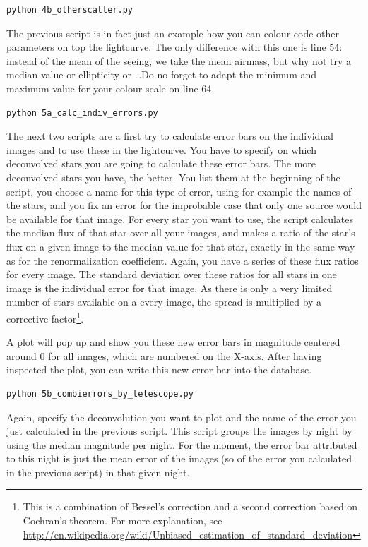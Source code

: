\begin{Verbatim}
python 4b_otherscatter.py
\end{Verbatim}

The previous script is in fact just an example how you can colour-code other parameters on top the lightcurve. The only difference with this one is line 54: instead of the mean of the seeing, we take the mean airmass, but why not try a median value or ellipticity or \ldots Do no forget to adapt the minimum and maximum value for your colour scale on line 64.

\begin{Verbatim}
python 5a_calc_indiv_errors.py
\end{Verbatim}

The next two scripts are a first try to calculate error bars on the individual images and to use these in the lightcurve. You have to specify on which deconvolved stars you are going to calculate these error bars. The more deconvolved stars you have, the better. You list them at the beginning of the script, you choose a name for this type of error, using for example the names of the stars, and you fix an error for the improbable case that only one source would be available for that image. 
For every star you want to use, the script calculates the median flux of that star over all your images, and makes a ratio of the star's flux on a given image to the median value for that star, exactly in the same way as for the renormalization coefficient. Again, you have a series of these flux ratios for every image. The standard deviation over these ratios for all stars in one image is the individual error for that image. As there is only a very limited number of stars available on a every image, the spread is multiplied by a corrective factor\footnote{This is a combination of Bessel's correction and a second correction based on Cochran's theorem. For more explanation, see \url{http://en.wikipedia.org/wiki/Unbiased_estimation_of_standard_deviation}}. 

A plot will pop up and show you these new error bars in magnitude centered around 0 for all images, which are numbered on the X-axis. After having inspected the plot, you can write this new error bar into the database.

\begin{Verbatim}
python 5b_combierrors_by_telescope.py
\end{Verbatim}

Again, specify the deconvolution you want to plot and the name of the error you just calculated in the previous script. This script groups the images by night by using the median magnitude per night. For the moment, the error bar attributed to this night is just the mean error of the images (so of the error you calculated in the previous script) in that given night. 

